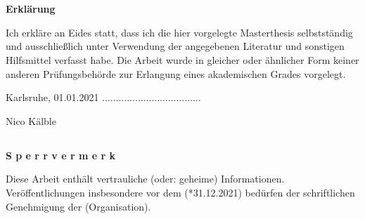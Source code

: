 \thispagestyle{empty}
\setcounter{page}{3}       %

\chapter*{}
\centerline{\Large \textsf{\textbf{Erklärung}}} \label{Erklaerung}%
\vspace*{2ex}
%
Ich erkläre an Eides statt, dass ich die hier vorgelegte Masterthesis
selbstständig und ausschließlich unter Verwendung der angegebenen
Literatur und sonstigen Hilfsmittel verfasst habe. Die Arbeit wurde in
gleicher oder ähnlicher Form keiner anderen Prüfungsbehörde zur
Erlangung eines akademischen Grades vorgelegt.\\

\vspace{1.5cm}

Karlsruhe, 01.01.2021 \hfill
$\ldots \ldots \ldots \ldots \ldots \ldots \ldots \ldots \ldots \ldots \ldots \ldots$\

\hspace*{10cm} Nico Kälble


\vspace{4cm}


\section*{}
\centerline{\Large \textsf{\textbf{S p e r r v e r m e r k}}} %

Diese Arbeit enthält vertrauliche (oder:  geheime) Informationen. 
Veröffentlichungen insbesondere vor dem (*31.12.2021) 
bedürfen der schriftlichen Genehmigung der (Organisation).


\raggedbottom
\cleardoublepage

